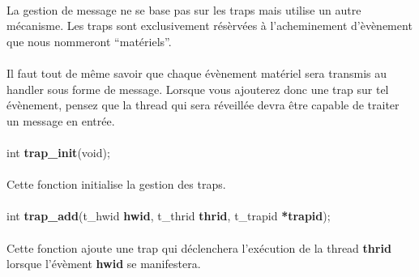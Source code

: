 \documentclass[10pt,a4wide]{article}
\begin{document}
\paragraph{}

La gestion de message ne se base pas sur les traps mais utilise un autre
m\'ecanisme. Les traps sont exclusivement r\'es\`erv\'ees \`a l'acheminement
d'\`ev\`enement que nous nommeront ``mat\'eriels''.

\paragraph{}

Il faut tout de m\^eme savoir que chaque \'ev\`enement mat\'eriel sera
transmis au handler sous forme de message. Lorsque vous ajouterez donc une
trap sur tel \'ev\`enement, pensez que la thread qui sera r\'eveill\'ee
devra \^etre capable de traiter un message en entr\'ee.

\paragraph{}

\hspace{1.5cm}int \textbf{trap\_init}(void);

\paragraph{}

Cette fonction initialise la gestion des traps.

\paragraph{}

\hspace{1.5cm}int \textbf{trap\_add}(t\_hwid \textbf{hwid},
                                     t\_thrid \textbf{thrid},
                                     t\_trapid \textbf{*trapid});

\paragraph{}

Cette fonction ajoute une trap qui d\'eclenchera l'ex\'ecution de la thread
\textbf{thrid} lorsque l'\'ev\`ement \textbf{hwid} se manifestera.

\paragraph{}
\end{document}
